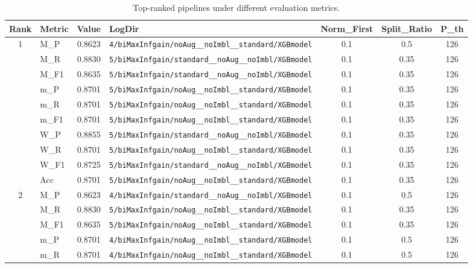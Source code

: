 \begin{table}[htbp]
\caption{Top-ranked pipelines under different evaluation metrics.}
\label{tab:rank_metric_vertical}
\centering
\small
\setlength{\tabcolsep}{4pt}
\begin{tabular}{|c|l|c|>{\ttfamily\footnotesize}p{7.2cm}|c|c|c|}
\hline
Rank & Metric & Value & LogDir & Norm\_First & Split\_Ratio & P\_th \\
\hline
\multirow{10}{*}{1} & M\_P & 0.8623 & \texttt{4/biMaxInfgain/noAug\_\_noImbl\_\_standard/XGBmodel} & 0.1 & 0.5  & 126 \\ 
 & M\_R & 0.8830 & \texttt{5/biMaxInfgain/standard\_\_noAug\_\_noImbl/XGBmodel} & 0.1 & 0.35  & 126 \\ 
 & M\_F1 & 0.8635 & \texttt{5/biMaxInfgain/standard\_\_noAug\_\_noImbl/XGBmodel} & 0.1 & 0.35  & 126 \\ 
 & m\_P & 0.8701 & \texttt{5/biMaxInfgain/noAug\_\_noImbl\_\_standard/XGBmodel} & 0.1 & 0.35  & 126 \\ 
 & m\_R & 0.8701 & \texttt{5/biMaxInfgain/noAug\_\_noImbl\_\_standard/XGBmodel} & 0.1 & 0.35  & 126 \\ 
 & m\_F1 & 0.8701 & \texttt{5/biMaxInfgain/noAug\_\_noImbl\_\_standard/XGBmodel} & 0.1 & 0.35  & 126 \\ 
 & W\_P & 0.8855 & \texttt{5/biMaxInfgain/standard\_\_noAug\_\_noImbl/XGBmodel} & 0.1 & 0.35  & 126 \\ 
 & W\_R & 0.8701 & \texttt{5/biMaxInfgain/noAug\_\_noImbl\_\_standard/XGBmodel} & 0.1 & 0.35  & 126 \\ 
 & W\_F1 & 0.8725 & \texttt{5/biMaxInfgain/standard\_\_noAug\_\_noImbl/XGBmodel} & 0.1 & 0.35  & 126 \\ 
 & Acc & 0.8701 & \texttt{5/biMaxInfgain/noAug\_\_noImbl\_\_standard/XGBmodel} & 0.1 & 0.35  & 126 \\ 
\hline
\multirow{10}{*}{2} & M\_P & 0.8623 & \texttt{4/biMaxInfgain/standard\_\_noAug\_\_noImbl/XGBmodel} & 0.1 & 0.5  & 126 \\ 
 & M\_R & 0.8830 & \texttt{5/biMaxInfgain/noAug\_\_noImbl\_\_standard/XGBmodel} & 0.1 & 0.35  & 126 \\ 
 & M\_F1 & 0.8635 & \texttt{5/biMaxInfgain/noAug\_\_noImbl\_\_standard/XGBmodel} & 0.1 & 0.35  & 126 \\ 
 & m\_P & 0.8701 & \texttt{4/biMaxInfgain/noAug\_\_noImbl\_\_standard/XGBmodel} & 0.1 & 0.5  & 126 \\ 
 & m\_R & 0.8701 & \texttt{4/biMaxInfgain/noAug\_\_noImbl\_\_standard/XGBmodel} & 0.1 & 0.5  & 126 \\ 

\end{tabular}
\end{table}
